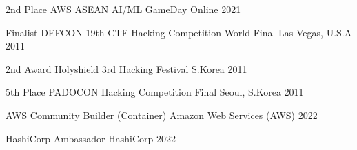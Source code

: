 
\begin{cvhonors}
  \cvhonor
    {2nd Place} %
    {AWS ASEAN AI/ML GameDay} %
    {Online} %
    {2021} %

  \cvhonor
    {Finalist} %
    {DEFCON 19th CTF Hacking Competition World Final} %
    {Las Vegas, U.S.A} %
    {2011} %
\end{cvhonors}

\begin{cvhonors}
  \cvhonor
    {2nd Award} %
    {Holyshield 3rd Hacking Festival} %
    {S.Korea} %
    {2011} %

  \cvhonor
    {5th Place} %
    {PADOCON Hacking Competition Final} %
    {Seoul, S.Korea} %
    {2011} %
\end{cvhonors}

\begin{cvhonors}
  \cvhonor
    {AWS Community Builder (Container)} %
    {Amazon Web Services (AWS)} %
    {} %
    {2022} %

  \cvhonor
    {HashiCorp Ambassador} %
    {HashiCorp} %
    {} %
    {2022} %
\end{cvhonors}
